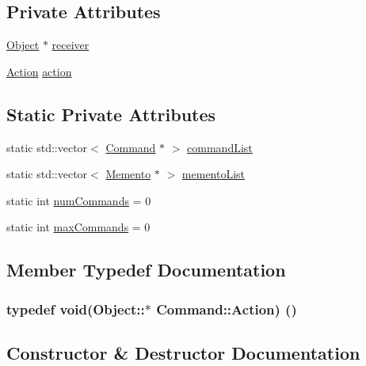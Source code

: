 \subsection*{Private Attributes}
\begin{DoxyCompactItemize}
\item 
\hyperlink{classObject}{Object} $\ast$ \hyperlink{classCommand_ac4a7e0c82bede3a8cd2f2b1478bd4763}{receiver}
\item 
\hyperlink{classCommand_a929c81cf8ef71dc52ef78156492f2a42}{Action} \hyperlink{classCommand_ac5473faf8b8b03ce83353838bc00c6dd}{action}
\end{DoxyCompactItemize}
\subsection*{Static Private Attributes}
\begin{DoxyCompactItemize}
\item 
static std\+::vector$<$ \hyperlink{classCommand}{Command} $\ast$ $>$ \hyperlink{classCommand_a3b694e6c1b5a3e62bdc0d7d1b3178eb1}{command\+List}
\item 
static std\+::vector$<$ \hyperlink{classMemento}{Memento} $\ast$ $>$ \hyperlink{classCommand_a03c855537275970db8e4b9c7ea64a9f9}{memento\+List}
\item 
static int \hyperlink{classCommand_a661b9cfc157529504ecf44528e4640b6}{num\+Commands} = 0
\item 
static int \hyperlink{classCommand_a06f1310ccbfdcfd18cfae03dcb428728}{max\+Commands} = 0
\end{DoxyCompactItemize}


\subsection{Member Typedef Documentation}
\subsubsection[{\texorpdfstring{Action}{Action}}]{\setlength{\rightskip}{0pt plus 5cm}typedef void(Object\+::$\ast$ Command\+::\+Action) ()\hspace{0.3cm}{\ttfamily [private]}}\hypertarget{classCommand_a929c81cf8ef71dc52ef78156492f2a42}{}\label{classCommand_a929c81cf8ef71dc52ef78156492f2a42}


\subsection{Constructor \& Destructor Documentation}
